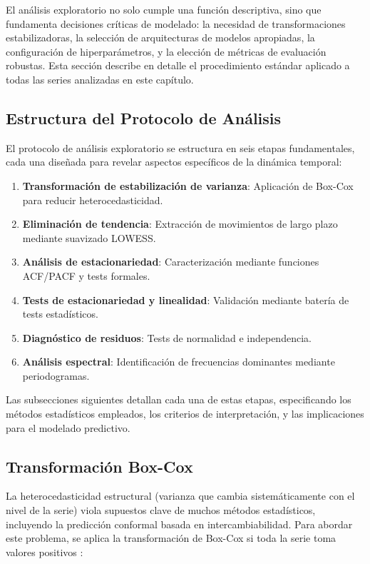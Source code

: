 El análisis exploratorio no solo cumple una función descriptiva, sino que fundamenta decisiones críticas de modelado: la necesidad de transformaciones estabilizadoras, la selección de arquitecturas de modelos apropiadas, la configuración de hiperparámetros, y la elección de métricas de evaluación robustas. Esta sección describe en detalle el procedimiento estándar aplicado a todas las series analizadas en este capítulo.

\subsection{Estructura del Protocolo de Análisis}
\label{subsec:eda_estructura}

El protocolo de análisis exploratorio se estructura en seis etapas fundamentales, cada una diseñada para revelar aspectos específicos de la dinámica temporal:

\begin{enumerate}
\item \textbf{Transformación de estabilización de varianza}: Aplicación de Box-Cox para reducir heterocedasticidad.
\item \textbf{Eliminación de tendencia}: Extracción de movimientos de largo plazo mediante suavizado LOWESS.
\item \textbf{Análisis de estacionariedad}: Caracterización mediante funciones ACF/PACF y tests formales.
\item \textbf{Tests de estacionariedad y linealidad}: Validación mediante batería de tests estadísticos.
\item \textbf{Diagnóstico de residuos}: Tests de normalidad e independencia.
\item \textbf{Análisis espectral}: Identificación de frecuencias dominantes mediante periodogramas.
\end{enumerate}

Las subsecciones siguientes detallan cada una de estas etapas, especificando los métodos estadísticos empleados, los criterios de interpretación, y las implicaciones para el modelado predictivo.

\subsection{Transformación Box-Cox}
\label{subsec:eda_boxcox}

La heterocedasticidad estructural (varianza que cambia sistemáticamente con el nivel de la serie) viola supuestos clave de muchos métodos estadísticos, incluyendo la predicción conformal basada en intercambiabilidad. Para abordar este problema, se aplica la transformación de Box-Cox si toda la serie toma valores positivos \parencite{BoxCox1964}:

